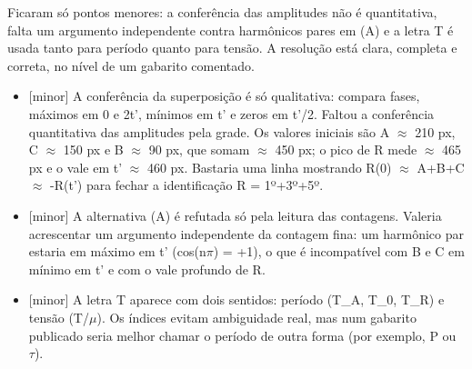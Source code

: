 \documentclass{article}%
\begin{document}
\newline%
Ficaram só pontos menores: a conferência das amplitudes não é quantitativa, falta um argumento independente contra harmônicos pares em (A) e a letra T é usada tanto para período quanto para tensão. A resolução está clara, completa e correta, no nível de um gabarito comentado.%
\begin{itemize}%
\item%
{[}minor{]} A conferência da superposição é só qualitativa: compara fases, máximos em 0 e 2t', mínimos em t' e zeros em t'/2. Faltou a conferência quantitativa das amplitudes pela grade. Os valores iniciais são A $\approx$ 210 px, C $\approx$ 150 px e B $\approx$ 90 px, que somam $\approx$ 450 px; o pico de R mede $\approx$ 465 px e o vale em t' $\approx$ 460 px. Bastaria uma linha mostrando R(0) $\approx$ A+B+C $\approx$ -R(t') para fechar a identificação R = 1º+3º+5º.%
\item%
{[}minor{]} A alternativa (A) é refutada só pela leitura das contagens. Valeria acrescentar um argumento independente da contagem fina: um harmônico par estaria em máximo em t' (cos(n$\pi$) = +1), o que é incompatível com B e C em mínimo em t' e com o vale profundo de R.%
\item%
{[}minor{]} A letra T aparece com dois sentidos: período (T\_A, T\_0, T\_R) e tensão (T/$\mu$). Os índices evitam ambiguidade real, mas num gabarito publicado seria melhor chamar o período de outra forma (por exemplo, P ou $\tau$).%
\end{itemize}%
\end{document}
